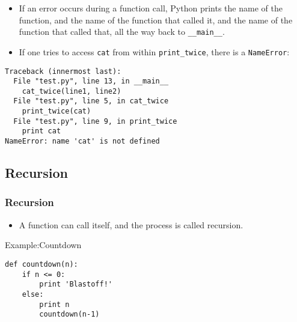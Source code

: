 \documentclass{beamer}
\begin{document}
%
\begin{frame}[fragile]
\begin{itemize}
\item
If an \alert{error} occurs during a function call, Python prints the
\alert{name of the function}, and the \alert{name of the function that called
it}, and the name of the function that called \alert{that}, all the
way back to \verb"__main__".

\item If one tries to access {\tt cat} from within 
\verb"print_twice", there is a {\tt NameError}:
\end{itemize}
\small
\begin{verbatim}
Traceback (innermost last):
  File "test.py", line 13, in __main__
    cat_twice(line1, line2)
  File "test.py", line 5, in cat_twice
    print_twice(cat)
  File "test.py", line 9, in print_twice
    print cat
NameError: name 'cat' is not defined
\end{verbatim}

\end{frame}

\subsection{Recursion}
\begin{frame}[fragile]
\frametitle{Recursion}
\begin{itemize}
\item A function can call itself, and the process is called \alert{recursion}.
\end{itemize}
\begin{block}{Example:Countdown}
\small
\begin{verbatim}
def countdown(n):
    if n <= 0:
        print 'Blastoff!'
    else:
        print n
        countdown(n-1)
\end{verbatim}
\end{block}
\end{frame}
\end{document}
